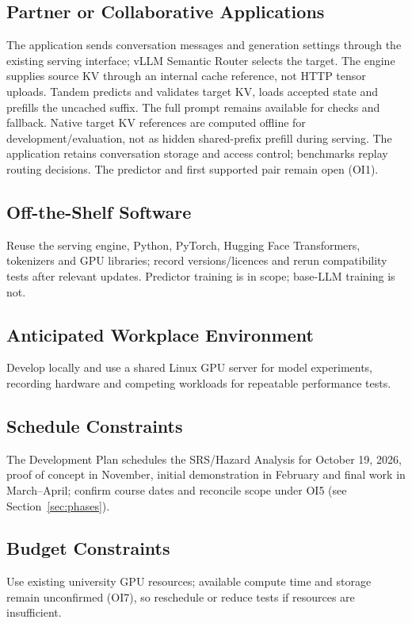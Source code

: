 \documentclass[12pt]{article}
\begin{document}
\subsection{Partner or Collaborative Applications}
The application sends conversation messages and generation settings through
the existing serving interface; vLLM Semantic Router selects the target. The engine supplies source KV through an internal
cache reference, not HTTP tensor uploads.
Tandem predicts and validates target KV, loads accepted state and prefills the
uncached suffix. The full prompt remains available for checks and fallback.
Native target KV references are computed offline for development/evaluation,
not as hidden shared-prefix prefill during serving. The application retains
conversation storage and access control; benchmarks replay routing decisions.
The predictor and first supported pair remain open (OI1).


\subsection{Off-the-Shelf Software}
Reuse the serving engine, Python, PyTorch, Hugging Face Transformers,
tokenizers and GPU libraries; record versions/licences and rerun compatibility
tests after relevant updates. Predictor training is in scope; base-LLM training is not.


\subsection{Anticipated Workplace Environment}
Develop locally and use a shared Linux GPU server for model experiments,
recording hardware and competing workloads for repeatable performance tests.


\subsection{Schedule Constraints}
The Development Plan schedules the SRS/Hazard Analysis for October 19, 2026,
proof of concept in November, initial demonstration in February and final
work in March--April; confirm course dates and reconcile scope under OI5
(see Section~\ref{sec:phases}).


\subsection{Budget Constraints}
Use existing university GPU resources; available compute time and storage
remain unconfirmed (OI7), so reschedule or reduce tests if resources are insufficient.
\end{document}

